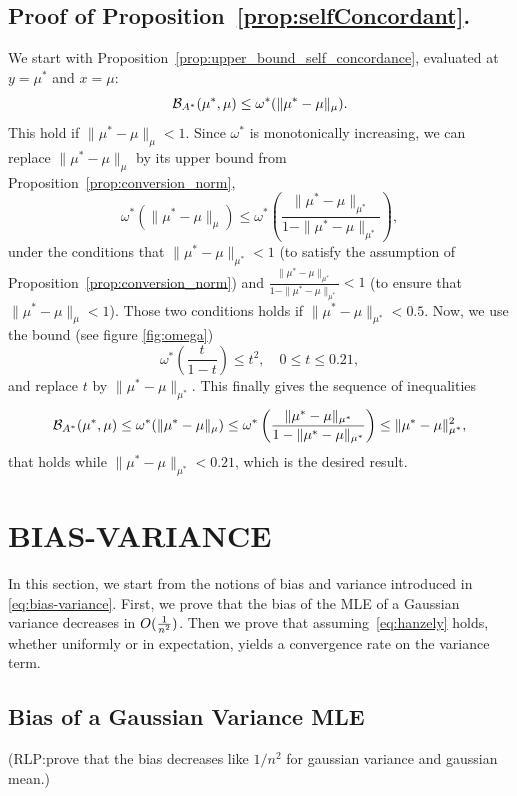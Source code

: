 \documentclass[twoside]{article}
\newcommand{\rlp}[1]{\textcolor{BrickRed}{(RLP:#1)}}
\newcommand{\logpart}{A}
\newcommand{\bregmanconj}{\cB_{\logpart^*}}
\newcommand{\m}{\mu}
\newcommand{\meanp}{\m}
\begin{document}
\subsection{Proof of Proposition~\ref{prop:selfConcordant}.}

We start with Proposition~\ref{prop:upper_bound_self_concordance}, evaluated at $y=\meanp^*$ and $x=\meanp$:
\[
	\bregmanconj(\meanp^*,\meanp) \leq \omega^*(\|\meanp^*-\meanp\|_{\meanp}).
\]
This hold if $\|\meanp^*-\meanp\|_{\meanp}<1$. Since $\omega^*$ is monotonically increasing, we can replace $\|\meanp^*-\meanp\|_{\meanp}$ by its upper bound from Proposition~\ref{prop:conversion_norm},
\[
	\omega^*(\|\meanp^*-\meanp\|_{\meanp}) \leq \omega^*\left(\frac{\|\meanp^*-\meanp\|_{\meanp^*}}{1-\|\meanp^*-\meanp\|_{\meanp^*}}\right),
\]
under the conditions that $\|\meanp^*-\meanp\|_{\meanp^*}<1$ (to satisfy the assumption of Proposition~\ref{prop:conversion_norm}) and $\frac{\|\meanp^*-\meanp\|_{\meanp^*}}{1-\|\meanp^*-\meanp\|_{\meanp^*}} <1$ (to ensure that $\|\meanp^*-\meanp\|_{\meanp} <1$). Those two conditions holds if $\|\meanp^*-\meanp\|_{\meanp^*} <0.5$. Now, we use the bound (see figure \ref{fig:omega})
\[
	\omega^*\left(\frac{t}{1-t}\right) \leq t^2, \quad 0\leq t \leq 0.21,
\]
and replace $t$ by $\|\meanp^*-\meanp\|_{\meanp^*}$. This finally gives the sequence of inequalities
\[
	\bregmanconj(\meanp^*,\meanp) \leq \omega^*(\|\meanp^*-\meanp\|_{\meanp}) \leq \omega^*\left(\frac{\|\meanp^*-\meanp\|_{\meanp^*}}{1-\|\meanp^*-\meanp\|_{\meanp^*}}\right) \leq \|\meanp^*-\meanp\|_{\meanp^*}^2,
\]
that holds while $ \|\meanp^*-\meanp\|_{\meanp^*}<0.21$, which is the desired result.



\section{BIAS-VARIANCE}
\label{app:bias-variance}
In this section, we start from the notions of bias and variance introduced in \cref{eq:bias-variance}.
First, we prove that the bias of the MLE of a Gaussian variance decreases in $O(\frac{1}{n^2})$. 
Then we prove that assuming~\eqref{eq:hanzely} holds, whether uniformly or in expectation, yields a convergence rate on the variance term.

\subsection{Bias of a Gaussian Variance MLE}
\rlp{prove that the bias decreases like $1/n^2$ for gaussian variance and gaussian mean.}
\end{document}

